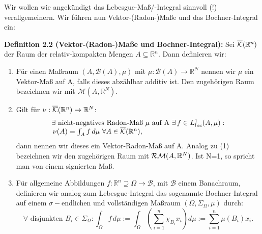 Wir wollen wie angekündigt das Lebesgue-Maß/-Integral sinnvoll (!) verallgemeinern. Wir führen nun Vektor-(Radon-)Maße und das Bochner-Integral ein:\\[0.5cm]
\colorbox{generalYellow}{\begin{minipage}{16cm}{\textcolor{black}{}{\label{def2.2}}}
\textbf{Definition 2.2 (Vektor-(Radon-)Maße und Bochner-Integral):} Sei \(\overline{\mathcal{K}}(\mathbb{R}^n)\) der Raum der relativ-kompakten Mengen \(A \subseteq \mathbb{R}^n\). Dann definieren wir:
\begin{enumerate}
    \item Für einen Maßraum \((A,\mathcal{B}(A),\mu)\) mit \(\mu : \mathcal{B}(A) \to \mathbb{R}^N\) nennen wir \(\mu\) ein Vektor-Maß auf A, falls dieses abzählbar additiv ist. Den zugehörigen Raum bezeichnen wir mit \(\mathcal{M}(A,\mathbb{R}^N)\).
    \item Gilt für \(\nu: \overline{\mathcal{K}}(\mathbb{R}^n) \to \mathbb{R}^N\):
    \begin{equation}
    \begin{array}{l}
        \exists \text{ nicht-negatives Radon-Maß } \mu \text{ auf A } \exists \, f \in L^1_{loc}(A,\mu): \\ 
        \, \nu(A) = \int_{A} f\, d\mu \, \, \forall A \in \overline{\mathcal{K}}(\mathbb{R}^n),
    \end{array}
    \end{equation}
    dann nennen wir dieses ein Vektor-Radon-Maß auf A. Analog zu (1) \\bezeichnen wir den zugehörigen Raum mit \(\mathcal{RM}(A,\mathbb{R}^N)\). Ist N=1, so spricht man von einem signierten Maß.
    \item Für allgemeine Abbildungen \(f: \mathbb{R}^n \supseteq \Omega \to \mathcal{B}\), mit \(\mathcal{B}\) einem Banachraum, definieren wir analog zum Lebesgue-Integral das sogenannte Bochner-Integral auf einem \(\sigma-\)endlichen und vollständigen Maßraum \((\Omega,\Sigma_{\Omega},\mu)\) durch:
    \begin{equation}
        \forall \text{ disjunkten } B_i \in \Sigma_{\Omega}: \int_{\Omega} f \, d\mu := \int_{\Omega} (\sum_{i=1}^n \chi_{B_i}x_i) d\mu := \sum_{i=1}^n \mu(B_i)x_i .
    \end{equation}
\end{enumerate}
\end{minipage}}

